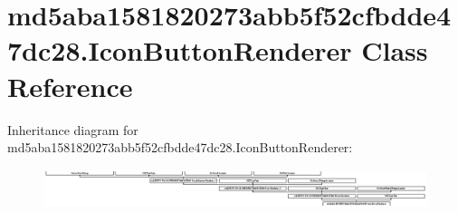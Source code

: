 \hypertarget{classmd5aba1581820273abb5f52cfbdde47dc28_1_1IconButtonRenderer}{}\section{md5aba1581820273abb5f52cfbdde47dc28.\+Icon\+Button\+Renderer Class Reference}
\label{classmd5aba1581820273abb5f52cfbdde47dc28_1_1IconButtonRenderer}
Inheritance diagram for md5aba1581820273abb5f52cfbdde47dc28.\+Icon\+Button\+Renderer\+:\begin{figure}[H]
\begin{center}
\leavevmode
\includegraphics[height=1.143791cm]{classmd5aba1581820273abb5f52cfbdde47dc28_1_1IconButtonRenderer}
\end{center}
\end{figure}
